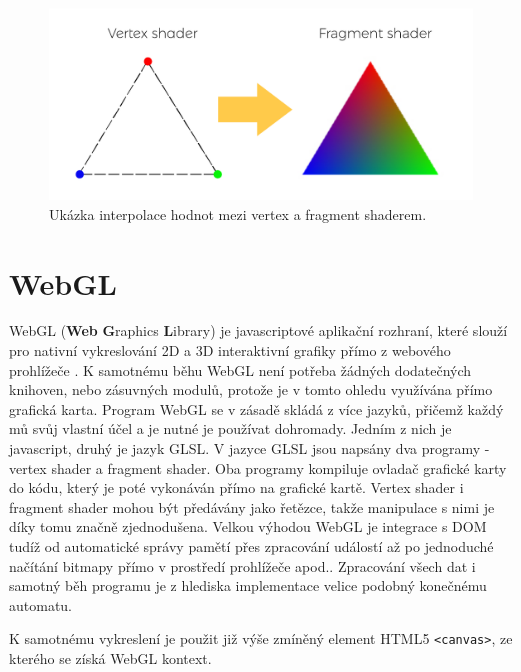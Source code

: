  
\begin{figure}[h]
	\label{img:1}
	\centering
	\includegraphics[scale=1.0,angle=0,width=1.0\linewidth]{obrazky-figures/interpolace}
	\caption{Ukázka interpolace hodnot mezi vertex a fragment shaderem.}
	\label{fig:inter}
\end{figure}
 



\newpage

\section{WebGL}
WebGL (\textbf{Web} \textbf{G}raphics \textbf{L}ibrary) je javascriptové aplikační rozhraní, které slouží pro nativní vykreslování 2D a 3D interaktivní grafiky přímo z webového prohlížeče \cite{mozilla}. K samotnému běhu WebGL není potřeba žádných dodatečných knihoven, nebo zásuvných modulů, protože je v tomto ohledu využívána přímo grafická karta. Program WebGL se v zásadě skládá z více jazyků, přičemž každý mů svůj vlastní účel a je nutné je používat dohromady. Jedním z nich je javascript, druhý je jazyk GLSL. V jazyce GLSL jsou napsány dva programy - vertex shader a fragment shader. Oba programy kompiluje ovladač grafické karty do kódu, který je poté vykonáván přímo na grafické kartě. Vertex shader i fragment shader mohou být předávány jako řetězce, takže manipulace s nimi je díky tomu značně zjednodušena. Velkou výhodou WebGL je integrace s DOM tudíž od automatické správy pamětí přes zpracování událostí až po jednoduché načítání bitmapy přímo v prostředí prohlížeče apod.. Zpracování všech dat i samotný běh programu je z hlediska implementace velice podobný konečnému automatu. 

K samotnému vykreslení je použit již výše zmíněný element HTML5 \texttt{<canvas>}, ze kterého se získá WebGL kontext.

